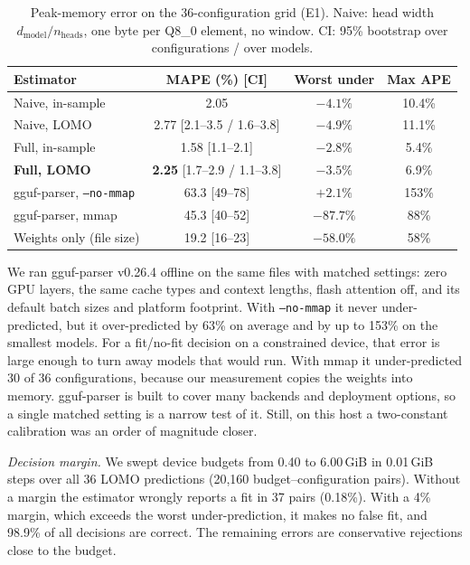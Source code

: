 \documentclass[conference]{IEEEtran}
\begin{document}
\begin{table}[t]
\centering
\caption{Peak-memory error on the 36-configuration grid (E1). Naive: head width $d_{\mathrm{model}}/n_{\mathrm{heads}}$, one byte per Q8\_0 element, no window. CI: 95\% bootstrap over configurations / over models.}
\label{tab:acc}
\footnotesize
\setlength{\tabcolsep}{3pt}
\begin{tabular}{@{}lccc@{}}
\toprule
Estimator & MAPE (\%) [CI] & Worst under & Max APE \\
\midrule
Naive, in-sample & 2.05 & $-4.1\%$ & 10.4\% \\
Naive, LOMO & 2.77 [2.1--3.5 / 1.6--3.8] & $-4.9\%$ & 11.1\% \\
Full, in-sample & 1.58 [1.1--2.1] & $-2.8\%$ & 5.4\% \\
\textbf{Full, LOMO} & \textbf{2.25} [1.7--2.9 / 1.1--3.8] & $\mathbf{-3.5\%}$ & 6.9\% \\
\midrule
gguf-parser, \texttt{--no-mmap} & 63.3 [49--78] & $+2.1\%$ & 153\% \\
gguf-parser, mmap & 45.3 [40--52] & $-87.7\%$ & 88\% \\
Weights only (file size) & 19.2 [16--23] & $-58.0\%$ & 58\% \\
\bottomrule
\end{tabular}
\end{table}

We ran gguf-parser v0.26.4 offline on the same files with matched settings: zero GPU layers, the same cache types and context lengths, flash attention off, and its default batch sizes and platform footprint. With \texttt{--no-mmap} it never under-predicted, but it over-predicted by 63\% on average and by up to 153\% on the smallest models. For a fit/no-fit decision on a constrained device, that error is large enough to turn away models that would run. With mmap it under-predicted 30 of 36 configurations, because our measurement copies the weights into memory. gguf-parser is built to cover many backends and deployment options, so a single matched setting is a narrow test of it. Still, on this host a two-constant calibration was an order of magnitude closer.

\textit{Decision margin.} We swept device budgets from 0.40 to 6.00\,GiB in 0.01\,GiB steps over all 36 LOMO predictions (20{,}160 budget--configuration pairs). Without a margin the estimator wrongly reports a fit in 37 pairs (0.18\%). With a 4\% margin, which exceeds the worst under-prediction, it makes no false fit, and 98.9\% of all decisions are correct. The remaining errors are conservative rejections close to the budget.
\end{document}
